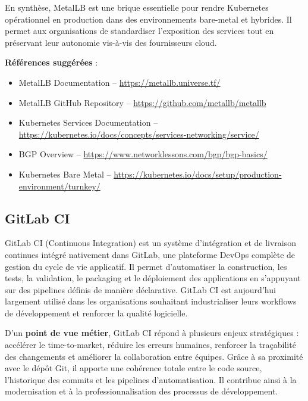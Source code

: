 En synthèse, MetalLB est une brique essentielle pour rendre Kubernetes opérationnel en production dans des environnements bare-metal et hybrides. Il permet aux organisations de standardiser l’exposition des services tout en préservant leur autonomie vis-à-vis des fournisseurs cloud.

\textbf{Références suggérées} :
\begin{itemize}
	\item MetalLB Documentation – \url{https://metallb.universe.tf/}
	\item MetalLB GitHub Repository – \url{https://github.com/metallb/metallb}
	\item Kubernetes Services Documentation – \url{https://kubernetes.io/docs/concepts/services-networking/service/}
	\item BGP Overview – \url{https://www.networklessons.com/bgp/bgp-basics/}
	\item Kubernetes Bare Metal – \url{https://kubernetes.io/docs/setup/production-environment/turnkey/}
\end{itemize}

\subsection{GitLab CI}

GitLab CI (Continuous Integration) est un système d’intégration et de livraison continues intégré nativement dans GitLab, une plateforme DevOps complète de gestion du cycle de vie applicatif. Il permet d’automatiser la construction, les tests, la validation, le packaging et le déploiement des applications en s’appuyant sur des pipelines définis de manière déclarative. GitLab CI est aujourd’hui largement utilisé dans les organisations souhaitant industrialiser leurs workflows de développement et renforcer la qualité logicielle.

D’un \textbf{point de vue métier}, GitLab CI répond à plusieurs enjeux stratégiques  : accélérer le time-to-market, réduire les erreurs humaines, renforcer la traçabilité des changements et améliorer la collaboration entre équipes. Grâce à sa proximité avec le dépôt Git, il apporte une cohérence totale entre le code source, l’historique des commits et les pipelines d’automatisation. Il contribue ainsi à la modernisation et à la professionnalisation des processus de développement.

